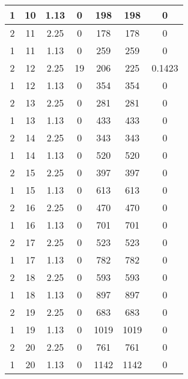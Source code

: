 \documentclass[letterpaper, 12pt]{article}
\begin{document}
\begin{longtable}{|c|c|c|c|c|c|c|}
\hline
1 & 10 & 1.13 & 0 & 198 & 198 & 0 \\
\hline
2 & 11 & 2.25 & 0 & 178 & 178 & 0 \\
\hline
1 & 11 & 1.13 & 0 & 259 & 259 & 0 \\
\hline
2 & 12 & 2.25 & 19 & 206 & 225 & 0.1423 \\
\hline
1 & 12 & 1.13 & 0 & 354 & 354 & 0 \\
\hline
2 & 13 & 2.25 & 0 & 281 & 281 & 0 \\
\hline
1 & 13 & 1.13 & 0 & 433 & 433 & 0 \\
\hline
2 & 14 & 2.25 & 0 & 343 & 343 & 0 \\
\hline
1 & 14 & 1.13 & 0 & 520 & 520 & 0 \\
\hline
2 & 15 & 2.25 & 0 & 397 & 397 & 0 \\
\hline
1 & 15 & 1.13 & 0 & 613 & 613 & 0 \\
\hline
2 & 16 & 2.25 & 0 & 470 & 470 & 0 \\
\hline
1 & 16 & 1.13 & 0 & 701 & 701 & 0 \\
\hline
2 & 17 & 2.25 & 0 & 523 & 523 & 0 \\
\hline
1 & 17 & 1.13 & 0 & 782 & 782 & 0 \\
\hline
2 & 18 & 2.25 & 0 & 593 & 593 & 0 \\
\hline
1 & 18 & 1.13 & 0 & 897 & 897 & 0 \\
\hline
2 & 19 & 2.25 & 0 & 683 & 683 & 0 \\
\hline
1 & 19 & 1.13 & 0 & 1019 & 1019 & 0 \\
\hline
2 & 20 & 2.25 & 0 & 761 & 761 & 0 \\
\hline
1 & 20 & 1.13 & 0 & 1142 & 1142 & 0 \\
\hline
\end{longtable}
\end{document}
